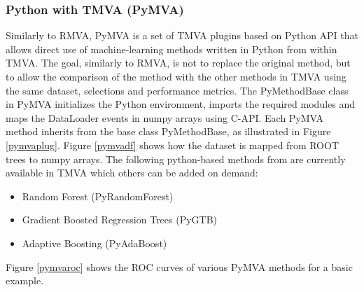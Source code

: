 \documentclass[a4paper]{jpconf}
\begin{document}
\subsubsection{Python with TMVA (PyMVA)} \label{PYMVA}
Similarly to RMVA, PyMVA is a set of TMVA plugins based on Python API that allows direct use of machine-learning methods written in Python from within TMVA. The goal, similarly to RMVA, is not to replace the original method, but to allow the comparison of the method with the other methods in TMVA using the same dataset, selections and performance metrics. 
The PyMethodBase class in PyMVA initializes the Python environment, imports the required modules and maps the DataLoader events in numpy arrays using C-API. Each PyMVA method inherits from the base class PyMethodBase, as illustrated in Figure \ref{pymvaplug}. Figure \ref{pymvadf} shows how the dataset is mapped from ROOT trees to numpy arrays. The following python-based methods from \cite{pedregosa2011scikit} are currently available in TMVA which others can be added on demand:


\begin{itemize}
\item Random Forest (PyRandomForest)
\item Gradient Boosted Regression Trees (PyGTB) 
\item Adaptive Boosting (PyAdaBoost) 
\end{itemize}

Figure \ref{pymvaroc} shows the ROC curves of various PyMVA methods for a basic example.
\end{document}
